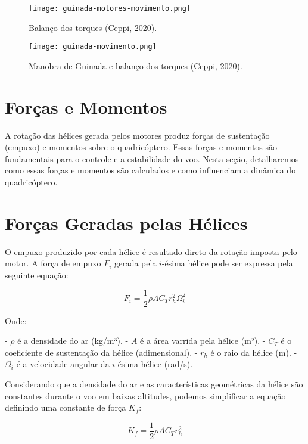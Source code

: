 \begin{figure}[H]
	\centering
	\texttt{[image: guinada-motores-movimento.png]}
	\caption{Balanço dos torques (Ceppi, 2020).}
	\label{fig:yaw_torques}
\end{figure}


\begin{figure}[H]
	\centering
	\texttt{[image: guinada-movimento.png]} %
	\caption{Manobra de Guinada e balanço dos torques (Ceppi, 2020).}
	\label{fig:yaw_maneuver_torques}
\end{figure}

\section{Forças e Momentos}

A rotação das hélices gerada pelos motores produz forças de sustentação (empuxo) e momentos sobre o quadricóptero. Essas forças e momentos são fundamentais para o controle e a estabilidade do voo. Nesta seção, detalharemos como essas forças e momentos são calculados e como influenciam a dinâmica do quadricóptero.

\section{Forças Geradas pelas Hélices}

O empuxo produzido por cada hélice é resultado direto da rotação imposta pelo motor. A força de empuxo \( F_i \) gerada pela \( i \)-ésima hélice pode ser expressa pela seguinte equação:

\begin{equation}
F_i = \frac{1}{2} \rho A C_T r_h^2 \Omega_i^2
\label{eq:forca_empuxo}
\end{equation}

Onde:

- \( \rho \) é a densidade do ar (kg/m³).
- \( A \) é a área varrida pela hélice (m²).
- \( C_T \) é o coeficiente de sustentação da hélice (adimensional).
- \( r_h \) é o raio da hélice (m).
- \( \Omega_i \) é a velocidade angular da \( i \)-ésima hélice (rad/s).

Considerando que a densidade do ar e as características geométricas da hélice são constantes durante o voo em baixas altitudes, podemos simplificar a equação definindo uma constante de força \( K_f \):

\begin{equation}
K_f = \frac{1}{2} \rho A C_T r_h^2
\label{eq:constante_forca}
\end{equation}

